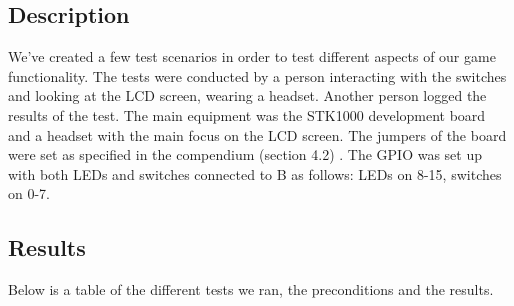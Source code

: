 \documentclass[a4paper,11pt]{article}
\begin{document}
\subsection{Description}

We've created a few test scenarios in order to test different aspects of our game functionality. The tests were conducted by a person interacting with the switches and looking at the LCD screen, wearing a headset. Another person logged the results of the test. The main equipment was the STK1000 development board and a headset with the main focus on the LCD screen. The jumpers of the board were set as specified in the compendium (section 4.2) \cite{komp}. The GPIO was set up with both LEDs and switches connected to B as follows: LEDs on 8-15, switches on 0-7. 





\subsection{Results}
Below is a table of the different tests we ran, the preconditions and the results. 
\end{document}
